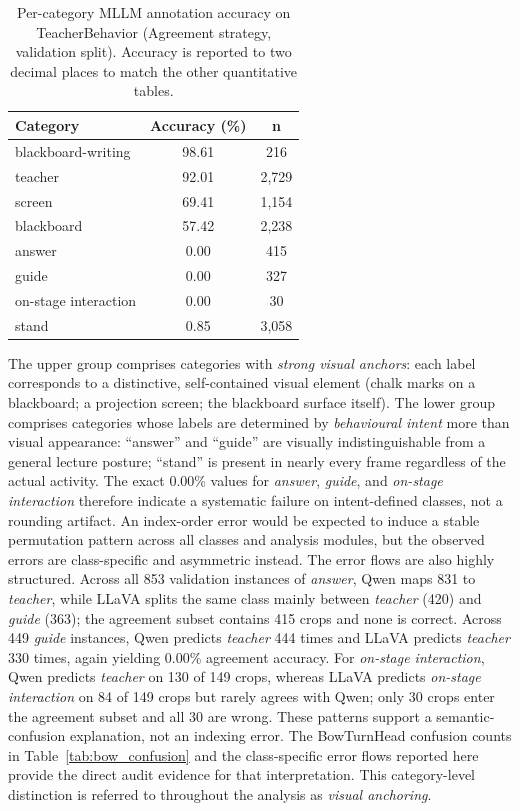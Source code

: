 \documentclass{ieeeaccess}
\begin{document}
\begin{table}[!t]
\caption{Per-category MLLM annotation accuracy on TeacherBehavior
(Agreement strategy, validation split). Accuracy is reported to two
decimal places to match the other quantitative tables.}
\label{tab:per_class}
\centering
\begin{tabular}{lcc}
\toprule
\textbf{Category} & \textbf{Accuracy (\%)} & \textbf{n} \\
\midrule
blackboard-writing  & 98.61 & 216  \\
teacher             & 92.01 & 2{,}729 \\
screen              & 69.41 & 1{,}154 \\
blackboard          & 57.42 & 2{,}238 \\
\midrule
answer              &  0.00 & 415  \\
guide               &  0.00 & 327  \\
on-stage interaction &  0.00 & 30   \\
stand               &  0.85 & 3{,}058 \\
\bottomrule
\end{tabular}
\end{table}

The upper group comprises categories with \emph{strong visual
anchors}: each label corresponds to a distinctive, self-contained
visual element (chalk marks on a blackboard; a projection screen; the
blackboard surface itself).
The lower group comprises categories whose labels are determined by
\emph{behavioural intent} more than visual appearance: ``answer''
and ``guide'' are visually indistinguishable from a general lecture
posture; ``stand'' is present in nearly every frame regardless of the
actual activity.
The exact 0.00\% values for \textit{answer}, \textit{guide}, and
\textit{on-stage interaction} therefore indicate a systematic failure
on intent-defined classes, not a rounding artifact.
An index-order error would be expected to induce a stable permutation
pattern across all classes and analysis modules, but the observed errors
are class-specific and asymmetric instead.
The error flows are also highly structured. Across all 853 validation
instances of \textit{answer}, Qwen maps 831 to \textit{teacher}, while
LLaVA splits the same class mainly between \textit{teacher} (420) and
\textit{guide} (363); the agreement subset contains 415 crops and none
is correct. Across 449 \textit{guide} instances, Qwen predicts
\textit{teacher} 444 times and LLaVA predicts \textit{teacher} 330
times, again yielding 0.00\% agreement accuracy. For
\textit{on-stage interaction}, Qwen predicts \textit{teacher} on 130 of
149 crops, whereas LLaVA predicts \textit{on-stage interaction} on 84
of 149 crops but rarely agrees with Qwen; only 30 crops enter the
agreement subset and all 30 are wrong. These patterns support a
semantic-confusion explanation, not an indexing error. The
BowTurnHead confusion counts in Table~\ref{tab:bow_confusion} and the
class-specific error flows reported here provide the direct audit
evidence for that interpretation.
This category-level distinction is referred to throughout the analysis
as \emph{visual anchoring}.
\end{document}
